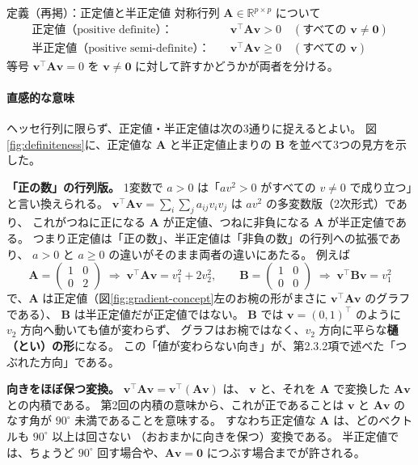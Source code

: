 \begin{itembox}[l]{定義（再掲）：正定値と半正定値}
対称行列 $\bm{A} \in \mathbb{R}^{p \times p}$ について
\begin{align*}
  \text{正定値（positive definite）：} \quad
    & \bm{v}^\top \bm{A}\bm{v} > 0 \quad (\text{すべての } \bm{v} \neq \bm{0}) \\
  \text{半正定値（positive semi-definite）：} \quad
    & \bm{v}^\top \bm{A}\bm{v} \geq 0 \quad (\text{すべての } \bm{v})
\end{align*}
等号 $\bm{v}^\top \bm{A}\bm{v} = 0$ を $\bm{v} \neq \bm{0}$ に対して許すかどうかが両者を分ける。
\end{itembox}

\paragraph{直感的な意味}
ヘッセ行列に限らず、正定値・半正定値は次の3通りに捉えるとよい。
図\ref{fig:definiteness}に、正定値な $\bm{A}$ と半正定値止まりの $\bm{B}$ を並べて3つの見方を示した。

\textbf{「正の数」の行列版。}
1変数で $a > 0$ は「$a v^2 > 0$ がすべての $v \neq 0$ で成り立つ」と言い換えられる。
$\bm{v}^\top \bm{A}\bm{v} = \sum_{i}\sum_{j} a_{ij} v_i v_j$ は $a v^2$ の多変数版（2次形式）であり、
これがつねに正になる $\bm{A}$ が正定値、つねに非負になる $\bm{A}$ が半正定値である。
つまり正定値は「正の数」、半正定値は「非負の数」の行列への拡張であり、
$a > 0$ と $a \geq 0$ の違いがそのまま両者の違いにあたる。
例えば
\begin{equation*}
  \bm{A} = \begin{pmatrix} 1 & 0 \\ 0 & 2 \end{pmatrix}
  \;\Longrightarrow\; \bm{v}^\top \bm{A}\bm{v} = v_1^2 + 2 v_2^2, \qquad
  \bm{B} = \begin{pmatrix} 1 & 0 \\ 0 & 0 \end{pmatrix}
  \;\Longrightarrow\; \bm{v}^\top \bm{B}\bm{v} = v_1^2
\end{equation*}
で、$\bm{A}$ は正定値（図\ref{fig:gradient-concept}左のお椀の形がまさに $\bm{v}^\top \bm{A}\bm{v}$ のグラフである）、
$\bm{B}$ は半正定値だが正定値ではない。
$\bm{B}$ では $\bm{v} = (0, 1)^\top$ のように $v_2$ 方向へ動いても値が変わらず、
グラフはお椀ではなく、$v_2$ 方向に平らな\textbf{樋（とい）の形}になる。
この「値が変わらない向き」が、第2.3.2項で述べた「つぶれた方向」である。

\textbf{向きをほぼ保つ変換。}
$\bm{v}^\top \bm{A}\bm{v} = \bm{v}^\top (\bm{A}\bm{v})$ は、
$\bm{v}$ と、それを $\bm{A}$ で変換した $\bm{A}\bm{v}$ との内積である。
第2回の内積の意味から、これが正であることは
$\bm{v}$ と $\bm{A}\bm{v}$ のなす角が $90^\circ$ 未満であることを意味する。
すなわち正定値な $\bm{A}$ は、どのベクトルも $90^\circ$ 以上は回さない
（おおまかに向きを保つ）変換である。
半正定値では、ちょうど $90^\circ$ 回す場合や、$\bm{A}\bm{v} = \bm{0}$ につぶす場合までが許される。

